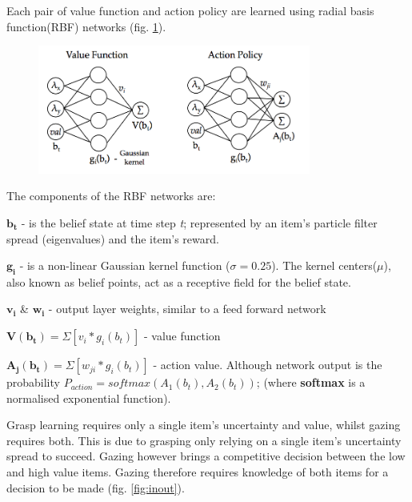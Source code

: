 \documentclass[11]{article}
\begin{document}
\pagebreak
Each pair of value function and action policy are learned using radial basis function(RBF) networks (fig. \ref{fig:rbf}).

\begin{figure}[!h]
	\centering
	\includegraphics[width=0.8\textwidth]{figures/rbf.png}
	\caption{}
	\label{fig:rbf}
\end{figure} 

The components of the RBF networks are:
\begin{list}{}{}
  \item $\pmb{b_t}$ - is the belief state at time step \emph{t}; represented by an item's particle filter spread (eigenvalues) and the item's reward. 

 \item $\pmb{g_i}$ - is a non-linear Gaussian kernel function ($\sigma=0.25$).
   The kernel centers($\mu$), also known as belief points, act as a receptive field for the belief state.

 \item $\pmb{v_i}$ \& $\pmb{w_i}$ - output layer weights, similar to a feed forward network

 \item $\pmb{V(b_t)}= \Sigma[v_i * g_i(b_t)]$ - value function

 \item $\pmb{A_j(b_t)}= \Sigma[w_{ji} * g_i(b_t)]$ - action value.
   Although network output is the probability $P_{action} = softmax(A_1(b_t),A_2(b_t))$; 
   (where \textbf{softmax} is a normalised exponential function).
\end{list}

Grasp learning requires only a single item's uncertainty and value, whilst gazing requires both. 
This is due to grasping only relying on a single item's uncertainty spread to succeed.
Gazing however brings a competitive decision between the low and high value items.
Gazing therefore requires knowledge of both items for a decision to be made (fig. \ref{fig:inout}). 
\end{document}
